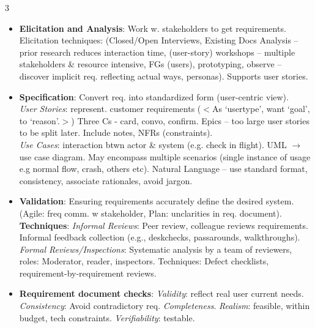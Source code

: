 \documentclass[a4paper, 10pt, landscape]{article}
\begin{document}
\begin{multicols*}{3}
\begin{itemize}
    \item \textbf{Elicitation and Analysis}: Work w. stakeholders to get requirements. Elicitation techniques: (Closed/Open Interviews, Existing Docs Analysis -- prior research reduces interaction time, (user-story) workshops -- multiple stakeholders \& resource intensive, FGs (users), prototyping, observe -- discover implicit req. reflecting actual ways, personas). Supports user stories.
    \item \textbf{Specification}: Convert req. into standardized form (user-centric view). \\
     \textit{User Stories}: represent. customer requirements ($<$As `usertype', want `goal', to `reason'.$>$) Three Cs - card, convo, confirm. Epics -- too large user stories to be split later. Include notes, NFRs (constraints). \\
    \textit{Use Cases}: interaction btwn actor \& system (e.g. check in flight). UML $\rightarrow$ use case diagram. May encompass multiple scenarios (single instance of usage e.g normal flow, crash, others etc). Natural Language -- use standard format, consistency, associate rationales, avoid jargon.
    \item \textbf{Validation}: Ensuring requirements accurately define the desired system. (Agile: freq comm. w stakeholder, Plan: unclarities in req. document). \textbf	\textbf{Techniques}: \textit{Informal Reviews}: Peer review, colleague reviews requirements. Informal feedback collection (e.g., deskchecks, passarounds, walkthroughs). \textit{Formal Reviews/Inspections}: Systematic analysis by a team of reviewers, roles: Moderator, reader, inspectors. Techniques: Defect checklists, requirement-by-requirement reviews. 
    \item \textbf{Requirement document checks}: \textit{Validity}: reflect real user current needs. \textit{Consistency}: Avoid contradictory req. \textit{Completeness}.  \textit{Realism}: feasible, within budget, tech constraints. \textit{Verifiability}: testable.
\end{itemize}


\end{multicols*}
\end{document}
